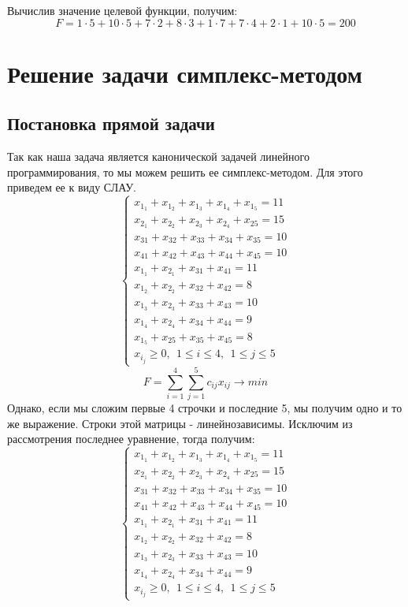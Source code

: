\documentclass{article}
\begin{document}
\noindent Вычислив значение целевой функции, получим:
$$F =  1\cdot 5 + 10\cdot 5 + 7\cdot 2 + 8\cdot 3 + 1\cdot 7+7\cdot4 + 2\cdot 1 + 10\cdot 5 = 200$$

\section{Решение задачи симплекс-методом}
\subsection{Постановка прямой задачи}
\noindent Так как наша задача является канонической задачей линейного программирования, то мы можем решить ее симплекс-методом. Для этого приведем ее к виду СЛАУ.
\begin{equation*}
    \begin{cases}
    x_1_1 + x_1_2 + x_1_3 + x_1_4 + x_1_5 = 11\\
    x_2_1 + x_2_2 + x_2_3 + x_2_4 + x_{25} =15\\
    x_{31} + x_{32} + x_{33} + x_{34} + x_{35} = 10\\
    x_{41} + x_{42} + x_{43} + x_{44} + x_{45} = 10\\
    x_1_1 + x_2_1 + x_{31} + x_{41} = 11\\
    x_1_2 + x_2_2 + x_{32} + x_{42} = 8\\
    x_1_3 + x_2_3 + x_{33} + x_{43} = 10\\
    x_1_4 + x_2_4 + x_{34} + x_{44} = 9\\
    x_1_5 + x_{25} + x_{35} + x_{45} = 8\\
    x_i_j \ge 0, ~~ 1 \le i \le 4, ~~ 1 \le j \le 5
    \end{cases}
    \label{sys}
\end{equation*}    
\begin{equation*}
    F = \displaystyle\sum_{i=1}^{4}\sum_{j=1}^{5} c_{ij}x_{ij} \longrightarrow min
\end{equation*}
\noindent Однако, если мы сложим первые 4 строчки и последние 5, мы получим одно и то же выражение. Строки этой матрицы - линейнозависимы. Исключим из рассмотрения последнее уравнение, тогда получим:
\begin{equation*}
    \begin{cases}
   x_1_1 + x_1_2 + x_1_3 + x_1_4 + x_1_5 = 11\\
    x_2_1 + x_2_2 + x_2_3 + x_2_4 + x_{25} =15\\
    x_{31} + x_{32} + x_{33} + x_{34} + x_{35} = 10\\
    x_{41} + x_{42} + x_{43} + x_{44} + x_{45} = 10\\
    x_1_1 + x_2_1 + x_{31} + x_{41} = 11\\
    x_1_2 + x_2_2 + x_{32} + x_{42} = 8\\
    x_1_3 + x_2_3 + x_{33} + x_{43} = 10\\
    x_1_4 + x_2_4 + x_{34} + x_{44} = 9\\
    x_i_j \ge 0, ~~ 1 \le i \le 4, ~~ 1 \le j \le 5
    \end{cases}
\end{equation*}    
\end{document}

